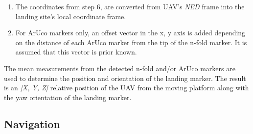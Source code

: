 \documentclass[conference, onecolumn, draftclsnofoot]{IEEEtran}
\begin{document}
\begin{enumerate}




\item The coordinates from step 6, are converted from UAV's \emph{NED} frame 
into the landing site's local coordinate frame.


\item For ArUco markers only, an offset vector in the x, y axis is added depending 
on the distance of each ArUco marker from the tip of the n-fold marker. 
It is assumed that this vector is prior known.

\end{enumerate}
%
The mean measurements from the detected n-fold and/or ArUco markers
are used to determine the position and orientation of the landing
marker. The result is an \emph{[X, Y, Z]} relative position of the UAV from
the moving platform along with the yaw orientation of the landing
marker.


\subsection{Navigation}
\label{sec:Navigation}
\end{document}

